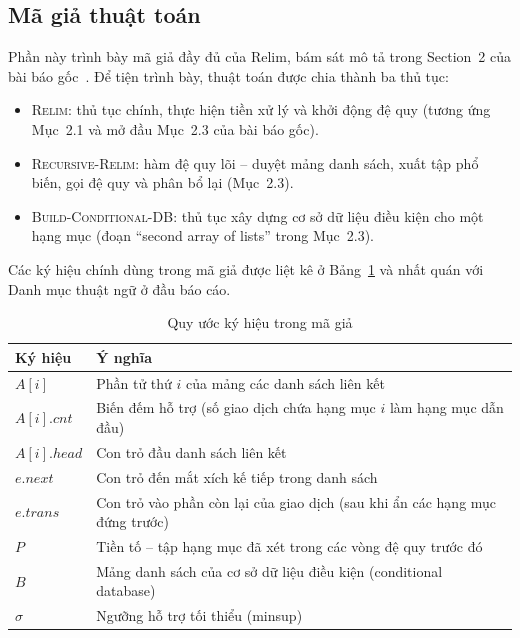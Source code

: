 \documentclass[12pt,a4paper]{report}
\begin{document}
 
\subsection{Mã giả thuật toán}
\label{subsec:relim-pseudocode}

Phần này trình bày mã giả đầy đủ của Relim, bám sát mô tả trong Section~2 của
bài báo gốc~\cite{borgelt2005}. Để tiện trình bày, thuật toán được chia thành
ba thủ tục:
\begin{itemize}
    \item \textsc{Relim}: thủ tục chính, thực hiện tiền xử lý và khởi động đệ
    quy (tương ứng Mục~2.1 và mở đầu Mục~2.3 của bài báo gốc).
    \item \textsc{Recursive-Relim}: hàm đệ quy lõi -- duyệt mảng danh sách,
    xuất tập phổ biến, gọi đệ quy và phân bổ lại (Mục~2.3).
    \item \textsc{Build-Conditional-DB}: thủ tục xây dựng cơ sở dữ liệu điều
    kiện cho một hạng mục (đoạn ``second array of lists'' trong Mục~2.3).
\end{itemize}
Các ký hiệu chính dùng trong mã giả được liệt kê ở Bảng~\ref{tab:pseudocode-notation}
và nhất quán với Danh mục thuật ngữ ở đầu báo cáo.

\begin{table}[H]
  \centering
  \caption{Quy ước ký hiệu trong mã giả}
  \label{tab:pseudocode-notation}
  \begin{tabularx}{\textwidth}{lX}
    \toprule
    \textbf{Ký hiệu} & \textbf{Ý nghĩa} \\
    \midrule
    $A[i]$ & Phần tử thứ $i$ của mảng các danh sách liên kết \\
    $A[i].\mathit{cnt}$ & Biến đếm hỗ trợ (số giao dịch chứa hạng mục $i$ làm hạng mục dẫn đầu) \\
    $A[i].\mathit{head}$ & Con trỏ đầu danh sách liên kết \\
    $e.\mathit{next}$ & Con trỏ đến mắt xích kế tiếp trong danh sách \\
    $e.\mathit{trans}$ & Con trỏ vào phần còn lại của giao dịch (sau khi ẩn các hạng mục đứng trước) \\
    $P$ & Tiền tố -- tập hạng mục đã xét trong các vòng đệ quy trước đó \\
    $B$ & Mảng danh sách của cơ sở dữ liệu điều kiện (conditional database) \\
    $\sigma$ & Ngưỡng hỗ trợ tối thiểu (minsup) \\
    \bottomrule
  \end{tabularx}
\end{table}
\end{document}
